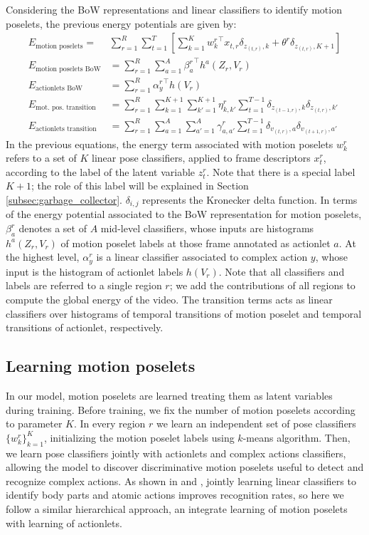 Considering the BoW representations and linear classifiers to identify motion 
poselets, 
the previous energy potentials are given by:
{\small
\begin{align}
\label{eq:motionposelets}E_{\text{motion poselets}}  =  &\sum_{r=1}^R\sum_{t=1}^T  \left[ \sum_{k=1}^K {w^r_k}^\top 
x_{t,r}\delta_{z_{(t,r)},k} + \theta^r \delta_{z_{(t,r)},K+1}\right] \\
E_{\text{motion poselets BoW}} & = \sum_{r=1}^R \sum_{a=1}^A {\beta^r_{a}}^\top 
h^{a}(Z_r,V_r)\\
\label{eq:actionlets_BoW} E_{\text{actionlets BoW}} &=\sum_{r=1}^R {\alpha^r_{y}}^\top h(V_r)  \\
E_{\text{mot. pos. transition}} & = 
\sum_{r=1}^R\sum_{k=1}^{K+1}\sum_{k'=1}^{K+1} \eta^r_{k,k'} 
\sum_{t=1}^{T-1} \delta_{z_{(t-1,r)},k}\delta_{z_{(t,r)},k'}\\ 
\label{eq:actionletstransition}
E_{\text{actionlets transition}} & =\sum_{r=1}^R\sum_{a=1}^A\sum_{a'=1}^A \gamma^r_{a,a'} 
\sum_{t=1}^{T-1} 
\delta_{v_{(t,r)},a}\delta_{v_{(t+1,r)},a'} 
\end{align}
}
In the previous equations, the energy term associated with motion poselets 
$w^r_k$ refers to a set of $K$ linear pose classifiers, applied to frame 
descriptors $x_t^r$, according to the label of the latent variable $z_t^r$. 
Note that there is a special label $K+1$; the role of this label will be 
explained in Section \ref{subsec:garbage_collector}. $\delta_{i,j}$ represents 
the Kronecker delta function. In terms of the energy potential associated to 
the BoW representation for motion poselets, $\beta_a^r$ denotes a set of $A$ 
mid-level classifiers, whose inputs are histograms $h^a(Z_r,V_r)$ of motion 
poselet labels at those frame annotated as actionlet $a$. At the highest level, 
$\alpha^r_{y}$ is a linear classifier  associated to complex action $y$, whose 
input is the histogram of actionlet labels $h(V_r)$. Note that all classifiers 
and labels are referred to a single region $r$; we add the contributions of all 
regions to compute the global energy of the video. The transition terms acts as 
linear classifiers over histograms of temporal transitions of motion poselet 
and temporal transitions of actionlet, respectively.

\subsection{Learning motion poselets}
In our model, motion poselets are learned treating them as latent variables  
during training. Before training, we fix the number of motion poselets 
according to parameter $K$. In every region $r$ we learn an independent 
set of pose classifiers $\{w^r_k\}_{k=1}^K$, initializing the motion poselet 
labels using $k$-means algorithm. Then, we learn pose classifiers jointly with 
actionlets and complex actions classifiers, allowing the model to discover 
discriminative motion poselets useful to detect and recognize complex actions. 
As shown in \cite{Lillo2014} and \cite{Tao2015}, jointly learning linear 
classifiers to identify body parts and atomic actions improves recognition 
rates, so here we follow a similar hierarchical approach, an integrate learning 
of motion poselets with learning of actionlets.     

